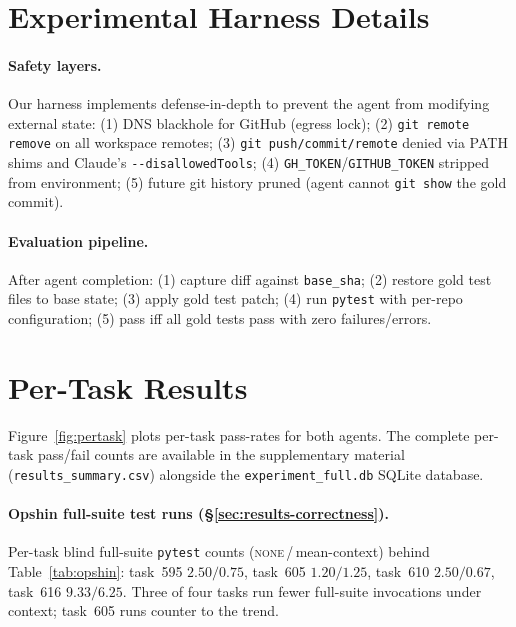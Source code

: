 \documentclass[11pt]{article}
\newcommand{\none}{\textsc{none}}
\begin{document}
\appendix
\section{Experimental Harness Details}
\label{app:harness}

\paragraph{Safety layers.}
Our harness implements defense-in-depth to prevent the agent from modifying external state:
(1) DNS blackhole for GitHub (egress lock);
(2) \texttt{git remote remove} on all workspace remotes;
(3) \texttt{git push/commit/remote} denied via PATH shims and Claude's \texttt{-{}-disallowedTools};
(4) \texttt{GH\_TOKEN}/\texttt{GITHUB\_TOKEN} stripped from environment;
(5) future git history pruned (agent cannot \texttt{git show} the gold commit).

\paragraph{Evaluation pipeline.}
After agent completion: (1) capture diff against \texttt{base\_sha};
(2) restore gold test files to base state;
(3) apply gold test patch;
(4) run \texttt{pytest} with per-repo configuration;
(5) pass iff all gold tests pass with zero failures/errors.

\section{Per-Task Results}
\label{app:pertask}

Figure~\ref{fig:pertask} plots per-task pass-rates for both agents. The complete per-task pass/fail counts are available in the supplementary material (\texttt{results\_summary.csv}) alongside the \texttt{experiment\_full.db} SQLite database.

\paragraph{Opshin full-suite test runs (\S\ref{sec:results-correctness}).}
Per-task blind full-suite \texttt{pytest} counts (\none{}\,/\,mean-context) behind Table~\ref{tab:opshin}: task~595 $2.50/0.75$, task~605 $1.20/1.25$, task~610 $2.50/0.67$, task~616 $9.33/6.25$. Three of four tasks run fewer full-suite invocations under context; task~605 runs counter to the trend.
\end{document}
